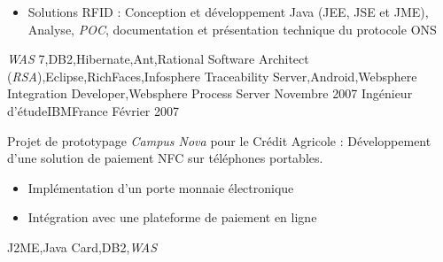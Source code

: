 \begin{experiences}
{\begin{itemize}
\begin{itemize}
                          \item Conception et développement JEE
                          \item Définition et implémentation des processus métiers
                          \item Définition et implémentation des médiations
                        \end{itemize}
                        \item Solutions RFID : Conception et développement Java (JEE, JSE et JME), Analyse, \emph{POC}, documentation et présentation technique du protocole ONS
                      \end{itemize}
                    }
                    {\emph{WAS} 7,DB2,Hibernate,Ant,Rational Software Architect (\emph{RSA}),Eclipse,RichFaces,Infosphere Traceability Server,Android,Websphere Integration Developer,Websphere Process Server}
  \emptySeparator         
  \experience
  {Novembre 2007}  {Ingénieur d'étude}{IBM}{France}
  {Février 2007}   {
                      Projet de prototypage \emph{Campus Nova} pour le Crédit Agricole : Développement d'une solution de paiement NFC sur téléphones portables.  
                      \begin{itemize}
                        \item Implémentation d'un porte monnaie électronique                                            
                        \item Intégration avec une plateforme de paiement en ligne  
                      \end{itemize}
                  }
                  {J2ME,Java Card,DB2,\emph{WAS}}  
\end{experiences}
